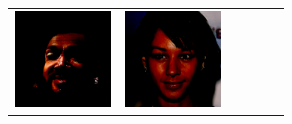 \documentclass{article}
\newcommand{\pganw}{1.0in}
\begin{document}
\begin{table}[htbp]
\begin{center}
\begin{tabular}{cc|cc|cc}
\includegraphics[width=\pganw]{figures/pgan/0_base_raw_reject.png} &
\includegraphics[width=\pganw]{figures/pgan/1_base_raw_base.png} &

\end{tabular}
\end{center}
\end{table}
\end{document}
